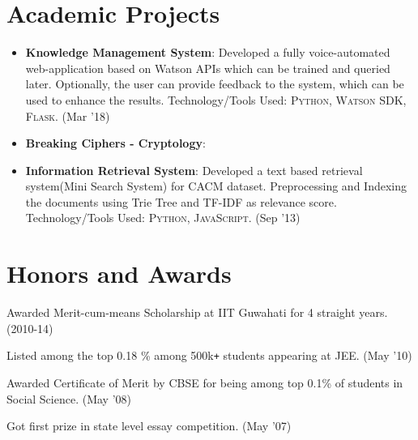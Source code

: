 \documentclass[letterpaper,10.8pt]{article}
\newcommand{\resumeItem}[2]{
  \item\small{
    \textbf{#1}{: #2 \vspace{-2pt}}
  }
}
\newcommand{\resumeSubItem}[2]{\resumeItem{#1}{#2}\vspace{-4pt}}
\newcommand{\resumeSubHeadingListStart}{\begin{itemize}[leftmargin=*]}
\newcommand{\resumeSubHeadingListEnd}{\end{itemize}}
\begin{document}
\section{Academic Projects}
\resumeSubHeadingListStart
\resumeSubItem{Knowledge Management System}{Developed a fully voice-automated web-application based on Watson APIs which can be trained and queried later. Optionally, the user can provide feedback to the system, which can be used to enhance the results. Technology/Tools Used: \textsc{Python, Watson SDK, Flask}. (Mar '18)}
\resumeSubItem{Breaking Ciphers - Cryptology}{}
\resumeSubItem{Information Retrieval System}{Developed a text based retrieval system(Mini Search System) for CACM dataset. Preprocessing and Indexing the documents using Trie Tree and TF-IDF as relevance score. Technology/Tools Used: \textsc{Python, JavaScript}. (Sep '13)}
\resumeSubHeadingListEnd

\section{Honors and Awards}
\begin{description}[font=$\bullet$]
\item {Awarded Merit-cum-means Scholarship at IIT Guwahati for 4 straight years. (2010-14)} 
\item {Listed among the top 0.18 \% among 500k\texttt{+} students appearing at JEE. (May '10)}
\item {Awarded Certificate of Merit by CBSE for being among top 0.1\% of students in Social Science. (May '08)}
\item {Got first prize in state level essay competition. (May '07)}
\end{description}
\end{document}
